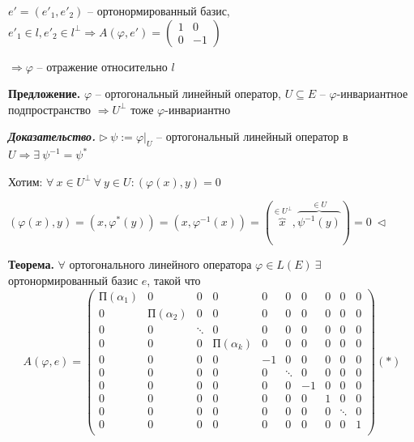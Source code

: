 $e' = (e'_1, e'_2)$ -- ортонормированный базис, $e'_1 \in l, e'_2 \in l^{\bot} \Rightarrow A(\varphi, e') = \begin{pmatrix} 1 & 0 \\ 0 & -1 \end{pmatrix}$

$\Rightarrow \varphi$ -- отражение относительно $l$

\vspace{\baselineskip}
\textbf{Предложение.} $\varphi$ -- ортогональный линейный оператор, $U \subseteq E$ -- $\varphi$-инвариантное подпространство $\Rightarrow U^{\bot}$ тоже $\varphi$-инвариантно

\vspace{\baselineskip}
\textbf{\textit{Доказательство.}} $\rhd \ \psi := \varphi|_{U}$ -- ортогональный линейный оператор в $U \Rightarrow \exists \ \psi^{-1} = \psi^*$

Хотим: $\forall \ x \in U^{\bot} \ \forall \ y \in U: (\varphi(x), y) = 0$

$(\varphi(x), y) = (x, \varphi^*(y)) = (x, \varphi^{-1}(x)) = (\overbrace{x}^{\in U^{\bot}}, \overbrace{\psi^{-1}(y)}^{\in U}) = 0 \ \lhd$

\vspace{\baselineskip}
\textbf{Теорема.} $\forall$ ортогонального линейного оператора $\varphi \in L(E) \ \exists$ ортонормированный базис $e$, такой что \begin{equation*}A(\varphi, e) = \left(
\begin{array}{c|c|c|c|c|c|c|c|c|c}
  П(\alpha_1) & 0 & 0 & 0 & 0 & 0 & 0 & 0 & 0 & 0  \\
  \hline
  0 & П(\alpha_2) & 0 & 0 & 0 & 0 & 0 & 0 & 0 & 0  \\
  \hline
  0 & 0 & \ddots & 0 & 0 & 0 & 0 & 0 & 0 & 0  \\
  \hline
  0 & 0 & 0 & П(\alpha_k) & 0 & 0 & 0 & 0 & 0 & 0 \\
  \hline
  0 & 0 & 0 & 0 & -1 & 0 & 0 & 0 & 0 & 0 \\
  \hline
  0 & 0 & 0 & 0 & 0 & \ddots & 0 & 0 & 0 & 0 \\
  \hline
  0 & 0 & 0 & 0 & 0 & 0 & -1 & 0 & 0 & 0 \\
  \hline
  0 & 0 & 0 & 0 & 0 & 0 & 0 & 1 & 0 & 0 \\
  \hline
  0 & 0 & 0 & 0 & 0 & 0 & 0 & 0 & \ddots & 0 \\
  \hline
  0 & 0 & 0 & 0 & 0 & 0 & 0 & 0 & 0 & 1 \\
\end{array}
\right) (*)\end{equation*}

